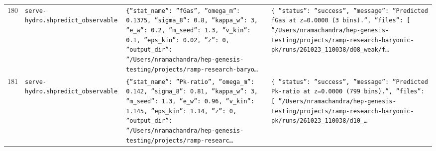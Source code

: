 \documentclass[11pt,a4paper]{article}
\begin{document}
\begin{longtable}{@{}p{}p{}p{}p{}@{}}
180 & \texttt{serve-hydro.sh}\newline\texttt{predict\_\allowbreak{}observable} & \texttt{\{''stat\_\allowbreak{}name'':\allowbreak{} ''fGas'',\allowbreak{} ''omega\_\allowbreak{}m'':\allowbreak{} 0.1375,\allowbreak{} ''sigma\_\allowbreak{}8'':\allowbreak{} 0.8,\allowbreak{} ''kappa\_\allowbreak{}w'':\allowbreak{} 3,\allowbreak{} ''e\_\allowbreak{}w'':\allowbreak{} 0.2,\allowbreak{} ''m\_\allowbreak{}seed'':\allowbreak{} 1.3,\allowbreak{} ''v\_\allowbreak{}kin'':\allowbreak{} 0.1,\allowbreak{} ''eps\_\allowbreak{}kin'':\allowbreak{} 0.02,\allowbreak{} ''z'':\allowbreak{} 0,\allowbreak{} ''output\_\allowbreak{}dir'':\allowbreak{} ''/\allowbreak{}Users/\allowbreak{}nramachandra/\allowbreak{}hep-genesis-testing/\allowbreak{}projects/\allowbreak{}ramp-research-baryo\ldots{}\allowbreak{}} & \texttt{\{   ''status'':\allowbreak{} ''success'',\allowbreak{}   ''message'':\allowbreak{} ''Predicted fGas at z=\allowbreak{}0.0000 (3 bins)\allowbreak{}.'',\allowbreak{}   ''files'':\allowbreak{} [     ''/\allowbreak{}Users/\allowbreak{}nramachandra/\allowbreak{}hep-genesis-testing/\allowbreak{}projects/\allowbreak{}ramp-research-baryonic-pk/\allowbreak{}runs/\allowbreak{}261023\_\allowbreak{}110038/\allowbreak{}d08\_\allowbreak{}weak/\allowbreak{}f\ldots{}\allowbreak{}} \\
181 & \texttt{serve-hydro.sh}\newline\texttt{predict\_\allowbreak{}observable} & \texttt{\{''stat\_\allowbreak{}name'':\allowbreak{} ''Pk-ratio'',\allowbreak{} ''omega\_\allowbreak{}m'':\allowbreak{} 0.142,\allowbreak{} ''sigma\_\allowbreak{}8'':\allowbreak{} 0.81,\allowbreak{} ''kappa\_\allowbreak{}w'':\allowbreak{} 3,\allowbreak{} ''m\_\allowbreak{}seed'':\allowbreak{} 1.3,\allowbreak{} ''e\_\allowbreak{}w'':\allowbreak{} 0.96,\allowbreak{} ''v\_\allowbreak{}kin'':\allowbreak{} 1.145,\allowbreak{} ''eps\_\allowbreak{}kin'':\allowbreak{} 1.14,\allowbreak{} ''z'':\allowbreak{} 0,\allowbreak{} ''output\_\allowbreak{}dir'':\allowbreak{} ''/\allowbreak{}Users/\allowbreak{}nramachandra/\allowbreak{}hep-genesis-testing/\allowbreak{}projects/\allowbreak{}ramp-researc\ldots{}\allowbreak{}} & \texttt{\{   ''status'':\allowbreak{} ''success'',\allowbreak{}   ''message'':\allowbreak{} ''Predicted Pk-ratio at z=\allowbreak{}0.0000 (799 bins)\allowbreak{}.'',\allowbreak{}   ''files'':\allowbreak{} [     ''/\allowbreak{}Users/\allowbreak{}nramachandra/\allowbreak{}hep-genesis-testing/\allowbreak{}projects/\allowbreak{}ramp-research-baryonic-pk/\allowbreak{}runs/\allowbreak{}261023\_\allowbreak{}110038/\allowbreak{}d10\_\allowbreak{}\ldots{}\allowbreak{}} \\

\end{longtable}
\end{document}
